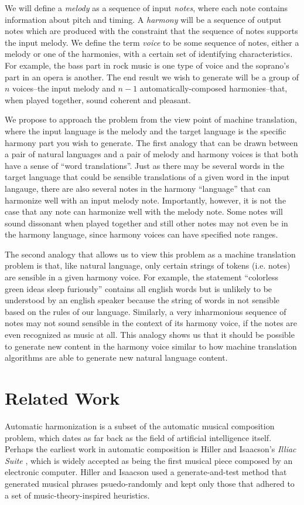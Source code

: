 \documentclass{sig-alternate}
\begin{document}
We will define a \textit{melody} as a sequence of input \textit{notes}, where each note contains information
about pitch and timing. A \textit{harmony} will be a sequence of output notes which are produced with
the constraint that the sequence of notes supports the input melody. We define the term \textit{voice}
to be some sequence of notes, either a melody or one of the harmonies, with a certain set of identifying 
characteristics. For example, the bass part in rock music is one type of voice and the soprano's part in an 
opera is another. The end result we wish to generate will be a group of $n$ voices--the input melody and 
$n-1$ automatically-composed harmonies--that, when played together, sound coherent and pleasant.

We propose to approach the problem from the view point of machine translation, where the input language
is the melody and the target language is the specific harmony part you wish to generate. The first analogy
that can be drawn between a pair of natural languages and a pair of melody and harmony voices is that both
have a sense of ``word translations''. Just as there may be several words in the target language that could
be sensible translations of a given word in the input langauge, there are also several notes in the harmony 
``language'' that can harmonize well with an input melody note. Importantly, however, it is not the case that
any note can harmonize well with the melody note. Some notes will sound dissonant when played together 
and still other notes may not even be in the harmony language, since harmony voices can have specified note
ranges. 

The second analogy that allows us to view this problem as a machine translation problem is that, like 
natural language, only certain strings of tokens (i.e. notes) are sensible in a given harmony voice. For example,
the statement ``colorless green ideas sleep furiously'' contains all english words but is unlikely to
be understood by an english speaker because the string of words in not sensible based on the rules of our
language. Similarly, a very inharmonious sequence of notes may not sound sensible in the context of its
harmony voice, if the notes are even recognized as music at all. This analogy shows us that it should be
possible to generate new content in the harmony voice similar to how machine translation algorithms are 
able to generate new natural language content.

\section{Related Work}
\label{sec:related_work}
Automatic harmonization is a subset of the automatic musical composition problem,
which dates as far back as the field of artificial intelligence itself. Perhaps
the earliest work in automatic composition is Hiller and Isaacson's
\textit{Illiac Suite} \cite{hiller1959experimental}, which is widely accepted as being the first
musical piece composed by an electronic computer. Hiller and Isaacson
used a generate-and-test method that generated musical phrases psuedo-randomly and 
kept only those that adhered to a set of music-theory-inspired heuristics. 
\end{document}
